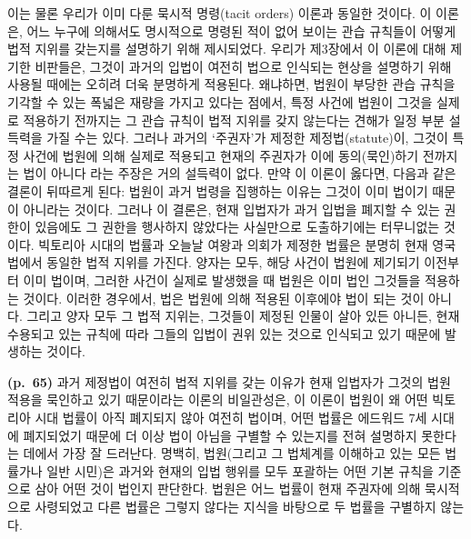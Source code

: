 이는 물론 우리가 이미 다룬 묵시적 명령(tacit orders) 이론과 동일한
것이다. 이 이론은, 어느 누구에 의해서도 명시적으로 명령된 적이 없어
보이는 관습 규칙들이 어떻게 법적 지위를 갖는지를 설명하기 위해
제시되었다. 우리가 제3장에서 이 이론에 대해 제기한 비판들은, 그것이
과거의 입법이 여전히 법으로 인식되는 현상을 설명하기 위해 사용될 때에는
오히려 더욱 분명하게 적용된다. 왜냐하면, 법원이 부당한 관습 규칙을
기각할 수 있는 폭넓은 재량을 가지고 있다는 점에서, 특정 사건에 법원이
그것을 실제로 적용하기 전까지는 그 관습 규칙이 법적 지위를 갖지 않는다는
견해가 일정 부분 설득력을 가질 수는 있다. 그러나 과거의 `주권자'가
제정한 제정법(statute)이, 그것이 특정 사건에 법원에 의해 실제로 적용되고
현재의 주권자가 이에 동의(묵인)하기 전까지는 법이 아니다 라는 주장은
거의 설득력이 없다. 만약 이 이론이 옳다면, 다음과 같은 결론이 뒤따르게
된다: 법원이 과거 법령을 집행하는 이유는 그것이 이미 법이기 때문이
아니라는 것이다. 그러나 이 결론은, 현재 입법자가 과거 입법을 폐지할 수
있는 권한이 있음에도 그 권한을 행사하지 않았다는 사실만으로 도출하기에는
터무니없는 것이다. 빅토리아 시대의 법률과 오늘날 여왕과 의회가 제정한
법률은 분명히 현재 영국법에서 동일한 법적 지위를 가진다. 양자는 모두,
해당 사건이 법원에 제기되기 이전부터 이미 법이며, 그러한 사건이 실제로
발생했을 때 법원은 이미 법인 그것들을 적용하는 것이다. 이러한 경우에서,
법은 법원에 의해 적용된 이후에야 법이 되는 것이 아니다. 그리고 양자 모두
그 법적 지위는, 그것들이 제정된 인물이 살아 있든 아니든, 현재 수용되고
있는 규칙에 따라 그들의 입법이 권위 있는 것으로 인식되고 있기 때문에
발생하는 것이다.

\textbf{(p.~65)} 과거 제정법이 여전히 법적 지위를 갖는 이유가 현재
입법자가 그것의 법원 적용을 묵인하고 있기 때문이라는 이론의 비일관성은,
이 이론이 법원이 왜 어떤 빅토리아 시대 법률이 아직 폐지되지 않아 여전히
법이며, 어떤 법률은 에드워드 7세 시대에 폐지되었기 때문에 더 이상 법이
아님을 구별할 수 있는지를 전혀 설명하지 못한다는 데에서 가장 잘
드러난다. 명백히, 법원(그리고 그 법체계를 이해하고 있는 모든 법률가나
일반 시민)은 과거와 현재의 입법 행위를 모두 포괄하는 어떤 기본 규칙을
기준으로 삼아 어떤 것이 법인지 판단한다. 법원은 어느 법률이 현재
주권자에 의해 묵시적으로 사령되었고 다른 법률은 그렇지 않다는 지식을
바탕으로 두 법률을 구별하지 않는다.

